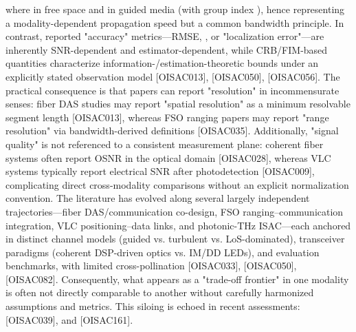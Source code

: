{}where  in free space and  in guided media (with group index ), hence representing a modality-dependent propagation speed but a common bandwidth principle. In contrast, reported "accuracy" metrics—RMSE, , or "localization error"—are inherently SNR-dependent and estimator-dependent, while CRB/FIM-based quantities characterize information-/estimation-theoretic bounds under an explicitly stated observation model [O\markdownRendererUnderscore{}ISAC\markdownRendererUnderscore{}013], [O\markdownRendererUnderscore{}ISAC\markdownRendererUnderscore{}050], [O\markdownRendererUnderscore{}ISAC\markdownRendererUnderscore{}056]. The practical consequence is that papers can report "resolution" in incommensurate senses: fiber DAS studies may report "spatial resolution" as a minimum resolvable segment length [O\markdownRendererUnderscore{}ISAC\markdownRendererUnderscore{}013], whereas FSO ranging papers may report "range resolution" via bandwidth-derived definitions [O\markdownRendererUnderscore{}ISAC\markdownRendererUnderscore{}035]. Additionally, "signal quality" is not referenced to a consistent measurement plane: coherent fiber systems often report OSNR in the optical domain [O\markdownRendererUnderscore{}ISAC\markdownRendererUnderscore{}028], whereas VLC systems typically report electrical SNR after photodetection [O\markdownRendererUnderscore{}ISAC\markdownRendererUnderscore{}009], complicating direct cross-modality comparisons without an explicit normalization convention.\markdownRendererParagraphSeparator
{} The literature has evolved along several largely independent trajectories—fiber DAS/communication co-design, FSO ranging–communication integration, VLC positioning–data links, and photonic-THz ISAC—each anchored in distinct channel models (guided vs. turbulent vs. LoS-dominated), transceiver paradigms (coherent DSP-driven optics vs. IM/DD LEDs), and evaluation benchmarks, with limited cross-pollination [O\markdownRendererUnderscore{}ISAC\markdownRendererUnderscore{}033], [O\markdownRendererUnderscore{}ISAC\markdownRendererUnderscore{}050], [O\markdownRendererUnderscore{}ISAC\markdownRendererUnderscore{}082]. Consequently, what appears as a "trade-off frontier" in one modality is often not directly comparable to another without carefully harmonized assumptions and metrics. This siloing is echoed in recent assessments:  [O\markdownRendererUnderscore{}ISAC\markdownRendererUnderscore{}039], and  [O\markdownRendererUnderscore{}ISAC\markdownRendererUnderscore{}161].\markdownRendererParagraphSeparator
